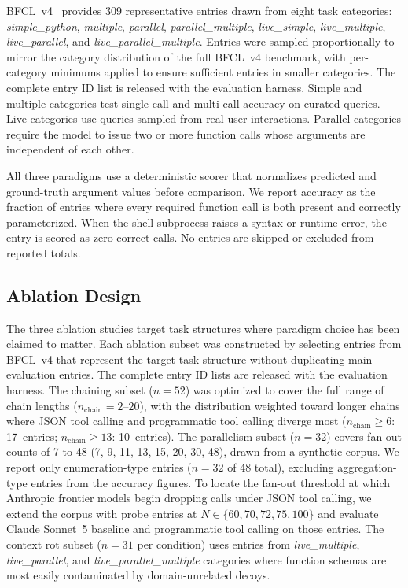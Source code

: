 \documentclass[11pt]{article}
\newcommand{\bfcl}{BFCL~v4}
\newcommand{\codemode}{programmatic tool calling}
\begin{document}
\bfcl{}~\citep{bfclaudit2026} provides 309 representative entries drawn from eight task categories:
\textit{simple\_python}, \textit{multiple}, \textit{parallel},
\textit{parallel\_multiple}, \textit{live\_simple}, \textit{live\_multiple},
\textit{live\_parallel}, and \textit{live\_parallel\_multiple}.
Entries were sampled proportionally to mirror the category distribution of the full \bfcl{} benchmark,
with per-category minimums applied to ensure sufficient entries in smaller categories.
The complete entry ID list is released with the evaluation harness.
Simple and multiple categories test single-call and multi-call accuracy on
curated queries. Live categories use queries sampled from real user interactions.
Parallel categories require the model to issue two or more function calls whose
arguments are independent of each other.

All three paradigms use a deterministic scorer that normalizes predicted and
ground-truth argument values before comparison.
We report accuracy as the fraction of entries where every required function call
is both present and correctly parameterized.
When the shell subprocess raises a syntax or runtime error, the entry is scored
as zero correct calls. No entries are skipped or excluded from reported totals.

\subsection{Ablation Design}

The three ablation studies target task structures where paradigm choice has been claimed
to matter.
Each ablation subset was constructed by selecting entries from \bfcl{} that
represent the target task structure without duplicating main-evaluation entries.
The complete entry ID lists are released with the evaluation harness.
The chaining subset ($n=52$) was optimized to cover the full range of chain
lengths ($n_{\text{chain}}=2$--$20$), with the distribution weighted toward
longer chains where JSON tool calling and \codemode{} diverge most ($n_{\text{chain}}\geq 6$:
17~entries; $n_{\text{chain}}\geq 13$: 10~entries).
The parallelism subset ($n=32$) covers fan-out counts of 7 to 48 (7, 9, 11, 13, 15, 20, 30, 48),
drawn from a synthetic corpus. We report only enumeration-type entries ($n=32$ of 48 total),
excluding aggregation-type entries from the accuracy figures.
To locate the fan-out threshold at which Anthropic frontier models begin dropping calls under
JSON tool calling, we extend the corpus with probe entries at $N \in \{60, 70, 72, 75, 100\}$
and evaluate Claude Sonnet~5 baseline and \codemode{} on those entries.
The context rot subset ($n=31$ per condition) uses entries from
\textit{live\_multiple}, \textit{live\_parallel}, and
\textit{live\_parallel\_multiple} categories where function schemas are most
easily contaminated by domain-unrelated decoys.
\end{document}
